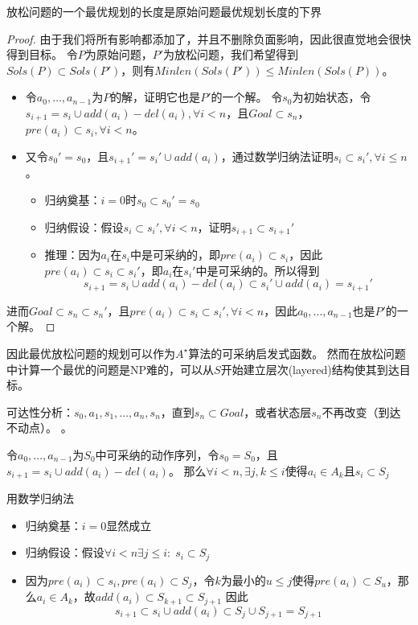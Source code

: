 \begin{theorem}
放松问题的一个最优规划的长度是原始问题最优规划长度的下界
\end{theorem}
\begin{proof}
由于我们将所有影响都添加了，并且不删除负面影响，因此很直觉地会很快得到目标。
令$P$为原始问题，$P'$为放松问题，我们希望得到$Sols(P)\subset Sols(P')$，则有$Minlen(Sols(P'))\leq Minlen(Sols(P))$。
\begin{itemize}
\item 令$a_0,\ldots,a_{n-1}$为$P$的解，证明它也是$P'$的一个解。
令$s_0$为初始状态，令$s_{i+1}=s_i\cup add(a_i)-del(a_i),\forall i<n$，且$Goal\subset s_n$，$pre(a_i)\subset s_i,\forall i < n$。
\item 又令$s_0'=s_0$，且$s_{i+1}'=s_i'\cup add(a_i)$，通过数学归纳法证明$s_i\subset s_i',\forall i \leq n$。
\begin{itemize}
	\item 归纳奠基：$i=0$时$s_0\subset s_0'=s_0$
	\item 归纳假设：假设$s_i\subset s_i',\forall i<n$，证明$s_{i+1}\subset s_{i+1}'$
	\item 推理：因为$a_i$在$s_i$中是可采纳的，即$pre(a_i)\subset s_i$，因此$pre(a_i)\subset s_i\subset s_i'$，即$a_i$在$s_i'$中是可采纳的。所以得到
	\[s_{i+1}=s_i\cup add(a_i)-del(a_i)\subset s_i'\cup add(a_i)=s_{i+1}'\]
\end{itemize}
\end{itemize}
进而$Goal\subset s_n\subset s_n'$，且$pre(a_i)\subset s_i\subset s_i',\forall i<n$，因此$a_0,\ldots,a_{n-1}$也是$P'$的一个解。
\end{proof}

因此最优放松问题的规划可以作为$A^\star$算法的可采纳启发式函数。
然而在放松问题中计算一个最优的问题是NP难的，可以从$S$开始建立层次(layered)结构使其到达目标。

可达性分析：$s_0,a_1,s_1,\ldots,a_n,s_n$，直到$s_n\subset Goal$，或者状态层$s_n$不再改变（到达不动点）。
。
\begin{proposition}
令$a_0,\ldots,a_{n-1}$为$S_0$中可采纳的动作序列，令$s_0=S_0$，且$s_{i+1}=s_i\cup add(a_i)-del(a_i)$。
那么$\forall i<n,\exists j,k\leq i$使得$a_i\in A_k$且$s_i\subset S_j$
\end{proposition}
\begin{analysis}
用数学归纳法
\begin{itemize}
	\item 归纳奠基：$i=0$显然成立
	\item 归纳假设：假设$\forall i <n \exists j\leq i:\;s_i\subset S_j$
	\item 因为$pre(a_i)\subset s_i,pre(a_i)\subset S_j$，令$k$为最小的$u\leq j$使得$pre(a_i)\subset S_u$，那么$a_i\in A_k$，故$add(a_i)\subset S_{k+1}\subset S_{j+1}$
	因此
	\[s_{i+1}\subset s_i\cup add(a_i)\subset S_j\cup S_{j+1}=S_{j+1}\]
\end{itemize}
\end{analysis}

